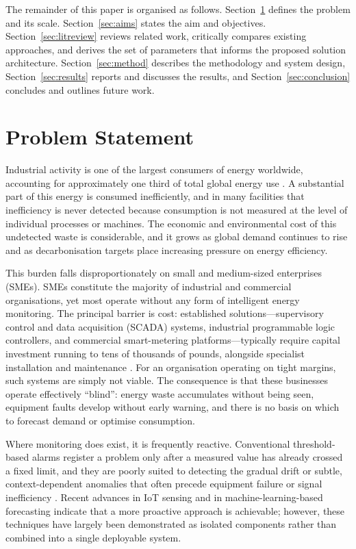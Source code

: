 \documentclass[conference]{IEEEtran}
\begin{document}
The remainder of this paper is organised as follows. Section~\ref{sec:problem}
defines the problem and its scale. Section~\ref{sec:aims} states the aim and
objectives. Section~\ref{sec:litreview} reviews related work, critically
compares existing approaches, and derives the set of parameters that informs the
proposed solution architecture. Section~\ref{sec:method} describes the
methodology and system design, Section~\ref{sec:results} reports and discusses
the results, and Section~\ref{sec:conclusion} concludes and outlines future
work.

\section{Problem Statement}\label{sec:problem}
 
Industrial activity is one of the largest consumers of energy worldwide,
accounting for approximately one third of total global energy use
\cite{international2022international}.
A substantial part of this energy is consumed inefficiently, and in many
facilities that inefficiency is never detected because consumption is not
measured at the level of individual processes or machines. The economic and
environmental cost of this undetected waste is considerable, and it grows as
global demand continues to rise and as decarbonisation targets place increasing
pressure on energy efficiency.
 
This burden falls disproportionately on small and medium-sized enterprises
(SMEs). SMEs constitute the majority of industrial and commercial organisations,
yet most operate without any form of intelligent energy monitoring. The
principal barrier is cost: established solutions---supervisory control and data
acquisition (SCADA) systems, industrial programmable logic controllers, and
commercial smart-metering platforms---typically require capital investment
running to tens of thousands of pounds, alongside specialist installation and
maintenance \cite{vijayalakshmi2023smart,silva2023iot}. For an organisation
operating on tight margins, such systems are simply not viable. The consequence
is that these businesses operate effectively ``blind'': energy waste accumulates
without being seen, equipment faults develop without early warning, and there is
no basis on which to forecast demand or optimise consumption.
 
Where monitoring does exist, it is frequently reactive. Conventional
threshold-based alarms register a problem only after a measured value has already
crossed a fixed limit, and they are poorly suited to detecting the gradual drift
or subtle, context-dependent anomalies that often precede equipment failure or
signal inefficiency \cite{himeur2021artificial}. Recent advances in IoT sensing
\cite{alaa2017review,hafeez2020efficient} and in machine-learning-based
forecasting \cite{kong2017short,raza2015review} indicate that a more proactive
approach is achievable; however, these techniques have largely been demonstrated
as isolated components rather than combined into a single deployable system.
 
\end{document}
